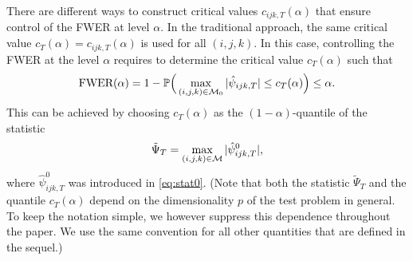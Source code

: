\documentclass[a4paper,12pt]{article}
\numberwithin{equation}{section}
\begin{document}
There are different ways to construct critical values $c_{ijk,T}(\alpha)$ that ensure control of the FWER at level $\alpha$. In the traditional approach, the same critical value $c_T(\alpha) = c_{ijk,T}(\alpha)$ is used for all $(i,j,k)$. In this case, controlling the FWER at the level $\alpha$ requires to determine the critical value $c_T(\alpha)$ such that
\begin{equation}\label{eq:FWER-tilde}
\text{FWER}(\alpha) = 1 - \mathbb{P}\Big( \max_{(i,j,k) \in \mathcal{M}_0} |\hat{\psi}_{ijk,T}| \le c_T(\alpha) \Big) \le \alpha. 
\end{equation}
This can be achieved by choosing $c_T(\alpha)$ as the $(1-\alpha)$-quantile of the statistic 
\[ \tilde{\Psi}_T = \max_{(i,j,k) \in \mathcal{M}} |\hat{\psi}_{ijk,T}^0|, \]
where $\hat{\psi}_{ijk,T}^0$ was introduced in \eqref{eq:stat0}. (Note that both the statistic $\tilde{\Psi}_T$ and the quantile $c_T(\alpha)$ depend on the dimensionality $p$ of the test problem in general. To keep the notation simple, we however suppress this dependence throughout the paper. We use the same convention for all other quantities that are defined in the sequel.) 
\end{document}
